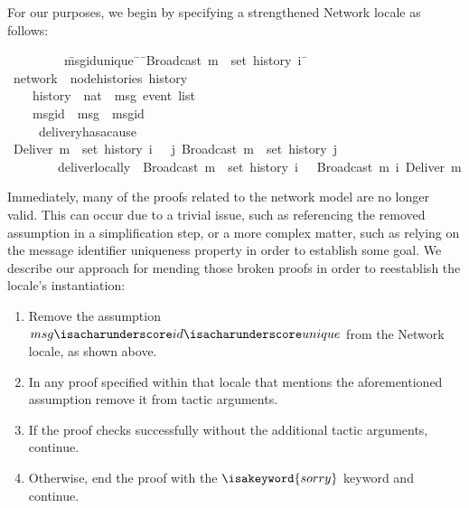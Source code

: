 For our purposes, we begin by specifying a strengthened Network locale as
follows:
\begin{isabelle}
~~~~~~~~\ \=msg{\isacharunderscore}id{\isacharunderscore}unique{\isacharcolon}\ \={\isasymrbrakk}\ \={\isachardoublequoteopen}Broadcast\ m\ {\isasymin}\ set\ {\isacharparenleft}history\ i{\isacharparenright}\ \=\kill
{}\ network\ {\isacharequal}\ node{\isacharunderscore}histories\ history\\
~~~~\>history\ {\isacharcolon}{\isacharcolon}\ {\isachardoublequoteopen}nat\ {\isasymRightarrow}\ {\isacharprime}msg\ event\ list{\isachardoublequoteclose}\ {\isacharplus}\\
~~~~\>msg{\isacharunderscore}id\ {\isacharcolon}{\isacharcolon}\ {\isachardoublequoteopen}{\isacharprime}msg\ {\isasymRightarrow}\ {\isacharprime}msgid{\isachardoublequoteclose}\\
~~~~\ delivery{\isacharunderscore}has{\isacharunderscore}a{\isacharunderscore}cause{\isacharcolon}\\
\>\>{\isasymlbrakk}\ {\isachardoublequoteopen}Deliver\ m\ {\isasymin}\ set\ {\isacharparenleft}history\ i{\isacharparenright}\ \>\>{\isasymrbrakk}\ {\isasymLongrightarrow}\ {\isasymexists}j{\isachardot}\ Broadcast\ m\ {\isasymin}\ set\ {\isacharparenleft}history\ j{\isacharparenright}{\isachardoublequoteclose}\\
~~~~~~~~\>deliver{\isacharunderscore}locally{\isacharcolon}\ \>{\isasymlbrakk}\ \>{\isachardoublequoteopen}Broadcast\ m\ {\isasymin}\ set\ {\isacharparenleft}history\ i{\isacharparenright}\ \>{\isasymrbrakk}\ {\isasymLongrightarrow}\  Broadcast\ m\ {\isasymsqsubset}\isactrlsup i\ Deliver\ m{\isachardoublequoteclose}\\
\end{isabelle}

Immediately, many of the proofs related to the network model are no longer
valid. This can occur due to a trivial issue, such as referencing the removed
assumption in a simplification step, or a more complex matter, such as relying
on the message identifier uniqueness property in order to establish some goal.
We describe our approach for mending those broken proofs in order to reestablish
the locale's instantiation:
\begin{enumerate}
  \item Remove the assumption
    $msg{\isacharunderscore}id{\isacharunderscore}unique$ from the Network
    locale, as shown above.
  \item In any proof specified within that locale that mentions the
    aforementioned assumption remove it from tactic arguments.
  \item If the proof checks successfully without the additional tactic
    arguments, continue.
  \item Otherwise, end the proof with the $\isakeyword{sorry}$ keyword and
    continue.
\end{enumerate}
